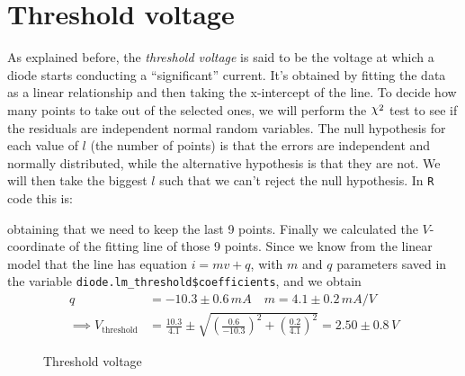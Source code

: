 \documentclass[notitlepage]{report}
\numberwithin{equation}{section}
\theoremstyle{plain}
\theoremstyle{definition}
\theoremstyle{remark}
\DeclareRobustCommand{\rchi}{{\mathpalette\irchi\relax}} %
\newcommand{\irchi}[2]{\raisebox{\depth}{$#1\chi$}} %
\begin{document}
\section{Threshold voltage}
As explained before, the \emph{threshold voltage} is said to be the voltage at
which a diode starts conducting a ``significant'' current. It's obtained by
fitting the data as a linear relationship and then taking the x-intercept of the
line. To decide how many points to take out of the selected ones, we will
perform the \(\rchi^2\)  test to see if the residuals are independent normal
random variables. The null hypothesis for each value of \(l\) (the number of
points) is that the errors are independent and normally distributed, while the
alternative hypothesis is that they are not. We will then take the biggest \(l\)
such that we can't reject the null hypothesis. In \texttt{R} code this is:

obtaining that we need to keep the last 9 points. Finally we calculated the
\(V\)-coordi\-nate of the fitting line of those 9 points. Since we know from the
linear model that the line has equation \(i = mv + q\), with \(m\) and \(q\)
parameters saved in the variable \texttt{diode.lm\_threshold\$coefficients}, and
we obtain
\begin{align*}
    q &= -10.3 \pm 0.6 \,mA \quad m = 4.1 \pm 0.2 \,mA / V \\
    \implies V_{\text{threshold}} &= \frac{10.3}{4.1} \pm \sqrt{\left(
    \frac{0.6}{-10.3} \right)^2 + \left( \frac{0.2}{4.1} \right)^2} = 2.50 \pm
     0.8\,V
\end{align*}

\begin{figure}
    \centering
{}
\caption{Threshold voltage}\label{fig:threshold}
\end{figure}
\end{document}
